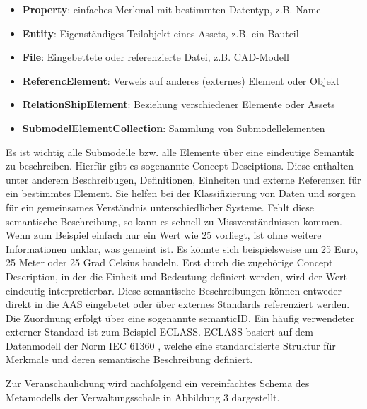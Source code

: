 \begin{itemize}
    \item \textbf{Property}: einfaches Merkmal mit bestimmten Datentyp, z.B. Name
    \item \textbf{Entity}: Eigenständiges Teilobjekt eines Assets, z.B. ein Bauteil 
    \item \textbf{File}: Eingebettete oder referenzierte Datei, z.B. CAD-Modell
    \item \textbf{ReferencElement}: Verweis auf anderes (externes) Element oder Objekt
    \item \textbf{RelationShipElement}: Beziehung verschiedener Elemente oder Assets
    \item \textbf{SubmodelElementCollection}: Sammlung von Submodellelementen
\end{itemize}
Es ist wichtig alle Submodelle bzw. alle Elemente über eine eindeutige Semantik zu beschreiben.
Hierfür gibt es sogenannte \glqq Concept Desciptions\grqq. Diese enthalten unter anderem Beschreibugen, Definitionen, Einheiten und externe Referenzen für ein bestimmtes Element.
Sie helfen bei der Klassifizierung von Daten und sorgen für ein gemeinsames Verständnis unterschiedlicher Systeme.
Fehlt diese semantische Beschreibung, so kann es schnell zu Missverständnissen kommen.
Wenn zum Beispiel einfach nur ein Wert wie 25 vorliegt, ist ohne weitere Informationen unklar, was gemeint ist. 
Es könnte sich beispielsweise um 25 Euro, 25 Meter oder 25 Grad Celsius handeln.
Erst durch die zugehörige Concept Description, in der die Einheit und Bedeutung definiert werden, wird der Wert eindeutig interpretierbar. 
Diese semantische Beschreibungen können entweder direkt in die AAS eingebetet oder über externes Standards referenziert werden.
Die Zuordnung erfolgt über eine sogenannte \glqq semanticID\grqq.
Ein häufig verwendeter externer Standard ist zum Beispiel ECLASS.
ECLASS basiert auf dem Datenmodell der Norm IEC 61360 \cite{ECLASSIEC61360}, welche eine standardisierte Struktur für Merkmale und deren semantische Beschreibung definiert.

Zur Veranschaulichung wird nachfolgend ein vereinfachtes Schema des Metamodells der Verwaltungsschale in Abbildung 3 dargestellt. 

